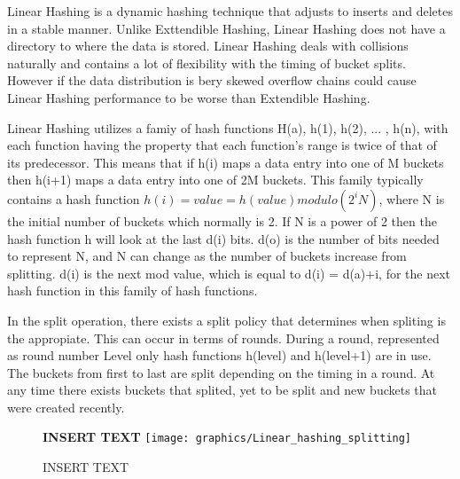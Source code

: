 \documentclass[letterpaper, 12pt]{article}
\begin{document}
Linear Hashing is a dynamic hashing technique that adjusts to inserts and deletes in a stable manner.
Unlike Exttendible Hashing, Linear Hashing does not have a directory to where the data is
stored. Linear Hashing deals with collisions naturally and contains a lot of flexibility with
the timing of bucket splits. However if the data distribution is bery skewed overflow chains could cause Linear Hashing performance to be
worse than Extendible Hashing.
\par\vspace{\baselineskip}
Linear Hashing utilizes a famiy of hash functions H(a), h(1), h(2), ... , h(n), with each function having the property that each function's
range is twice of that of its predecessor. This means that if h(i) maps a data entry into one of M buckets then h(i+1) maps a data entry into one
of 2M buckets. This family typically contains a hash function $ h(i) = value = h(value) modulo (2^i N) $, where N is the initial number of buckets
which normally is 2. If N is a power of 2 then the hash function h will look at the last d(i) bits. d(o) is the number of bits needed to represent
N, and N can change as the number of buckets increase from splitting. d(i) is the next mod value, which is equal to d(i) = d(a)+i, for the next hash function
in this family of hash functions.
\par\vspace{\baselineskip}
In the split operation, there exists a split policy that determines when spliting is the appropiate. This can occur in terms of rounds. During a round, represented
as round number Level only hash functions h(level) and h(level+1) are in use. The buckets from first to last are split depending on the timing in a round. At any
time there exists buckets that splited, yet to be split and new buckets that were created recently.
\par\vspace{\baselineskip}
\begin{figure}
  \centering
  \textbf{INSERT TEXT}
  \texttt{[image: graphics/Linear\_hashing\_splitting]}
  \caption{INSERT TEXT}
\end{figure}
\end{document}
